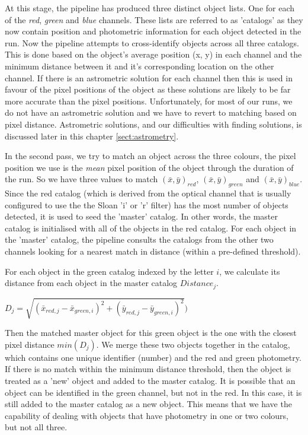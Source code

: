 At this stage, the pipeline has produced three distinct object lists. One for each of the \emph{red}, \emph{green} and \emph{blue} channels. These lists are referred to as 'catalogs' as they now contain position and photometric information for each object detected in the run.  Now the pipeline attempts to cross-identify objects across all three catalogs. This is done based on the object's average position (x, y) in each channel and the minimum distance between it and it's corresponding location on the other channel. If there is an astrometric solution for each channel then this is used in favour of the pixel positions of the object as these solutions are likely to be far more accurate than the pixel positions. Unfortunately, for most of our runs, we do not have an astrometric solution and we have to revert to matching based on pixel distance. Astrometric solutions, and our difficulties with finding solutions, is discussed later in this chapter \ref{sect:astrometry}.

In the second pass,  we try to match an object across the three colours, the pixel position we use is the \emph{mean} pixel position of the object through the duration of the run. So we have three values to match $(\bar{x}, \bar{y})_{red}$, $(\bar{x}, \bar{y})_{green}$ and $(\bar{x}, \bar{y})_{blue}$. Since the red catalog (which is derived from the optical channel that is usually configured to use the the Sloan 'i' or 'r' filter) has the most number of objects detected, it is used to seed the 'master' catalog. In other words, the master catalog is initialised with all of the objects in the red catalog. For each object in the 'master' catalog, the pipeline consults the catalogs from the other two channels looking for a nearest match in distance (within a pre-defined threshold).

For each object in the green catalog indexed by the letter $i$, we calculate its distance from each object in the master catalog $Distance_j$. 

$D_j = \sqrt{(\bar{x}_{red, j}-\bar{x}_{green, i})^2 + (\bar{y}_{red, j}-\bar{y}_{green, i})^2})$ 

Then the matched master object for this green object is the one with the closest pixel distance $min(D_j)$. We merge these two objects together in the catalog, which contains one unique identifier (number) and the red and green photometry. If there is no match within the minimum distance threshold, then the object is treated as a 'new' object and added to the master catalog. It is possible that an object can be identified in the green channel, but not in the red. In this case, it is still added to the master catalog as a new object. This means that we have the capability of dealing with objects that have photometry in one or two colours, but not all three. 

